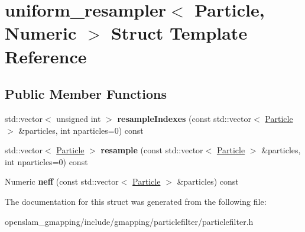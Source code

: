 \hypertarget{structuniform__resampler}{}\section{uniform\+\_\+resampler$<$ Particle, Numeric $>$ Struct Template Reference}
\label{structuniform__resampler}
\subsection*{Public Member Functions}
\begin{DoxyCompactItemize}
\item 
\mbox{\label{structuniform__resampler_a9097c86356bc84ff0130b5a688247838}} 
std\+::vector$<$ unsigned int $>$ {\bfseries resample\+Indexes} (const std\+::vector$<$ \hyperlink{structParticle}{Particle} $>$ \&particles, int nparticles=0) const
\item 
\mbox{\label{structuniform__resampler_a38b6375a3f75998078c669a62ca76d92}} 
std\+::vector$<$ \hyperlink{structParticle}{Particle} $>$ {\bfseries resample} (const std\+::vector$<$ \hyperlink{structParticle}{Particle} $>$ \&particles, int nparticles=0) const
\item 
\mbox{\label{structuniform__resampler_a1f6d66ec40619a3d96e399cb6c5140b3}} 
Numeric {\bfseries neff} (const std\+::vector$<$ \hyperlink{structParticle}{Particle} $>$ \&particles) const
\end{DoxyCompactItemize}


The documentation for this struct was generated from the following file\+:\begin{DoxyCompactItemize}
\item 
openslam\+\_\+gmapping/include/gmapping/particlefilter/particlefilter.\+h\end{DoxyCompactItemize}
